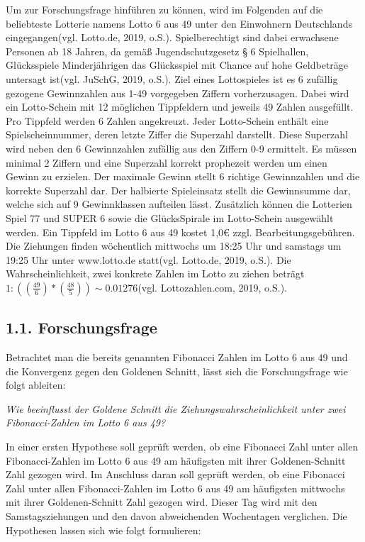 \documentclass[ngerman,]{article}
\newcommand{\euro}{€}
\begin{document}
Um zur Forschungsfrage hinführen zu können, wird im Folgenden auf die
beliebteste Lotterie namens Lotto 6 aus 49 unter den Einwohnern
Deutschlands eingegangen(vgl. Lotto.de, 2019, o.S.). Spielberechtigt
sind dabei erwachsene Personen ab 18 Jahren, da gemäß Jugendschutzgesetz
§ 6 Spielhallen, Glücksspiele Minderjährigen das Glücksspiel mit Chance
auf hohe Geldbeträge untersagt ist(vgl. JuSchG, 2019, o.S.). Ziel eines
Lottospieles ist es 6 zufällig gezogene Gewinnzahlen aus 1-49 vorgegeben
Ziffern vorherzusagen. Dabei wird ein Lotto-Schein mit 12 möglichen
Tippfeldern und jeweils 49 Zahlen ausgefüllt. Pro Tippfeld werden 6
Zahlen angekreuzt. Jeder Lotto-Schein enthält eine Spielscheinnummer,
deren letzte Ziffer die Superzahl darstellt. Diese Superzahl wird neben
den 6 Gewinnzahlen zufällig aus den Ziffern 0-9 ermittelt. Es müssen
minimal 2 Ziffern und eine Superzahl korrekt prophezeit werden um einen
Gewinn zu erzielen. Der maximale Gewinn stellt 6 richtige Gewinnzahlen
und die korrekte Superzahl dar. Der halbierte Spieleinsatz stellt die
Gewinnsumme dar, welche sich auf 9 Gewinnklassen aufteilen lässt.
Zusätzlich können die Lotterien Spiel 77 und SUPER 6 sowie die
GlücksSpirale im Lotto-Schein ausgewählt werden. Ein Tippfeld im Lotto 6
aus 49 kostet 1,0\euro{} zzgl. Bearbeitungsgebühren. Die Ziehungen
finden wöchentlich mittwochs um 18:25 Uhr und samstags um 19:25 Uhr
unter www.lotto.de statt(vgl. Lotto.de, 2019, o.S.). Die
Wahrscheinlichkeit, zwei konkrete Zahlen im Lotto zu ziehen beträgt
\(1:((\frac{49}{6})*(\frac{48}{5}))\sim0.01276\)(vgl. Lottozahlen.com,
2019, o.S.).

\subsection{1.1. Forschungsfrage}\label{forschungsfrage}

Betrachtet man die bereits genannten Fibonacci Zahlen im Lotto 6 aus 49
und die Konvergenz gegen den Goldenen Schnitt, lässt sich die
Forschungsfrage wie folgt ableiten:

\emph{Wie beeinflusst der Goldene Schnitt die Ziehungswahrscheinlichkeit
unter zwei Fibonacci-Zahlen im Lotto 6 aus 49?}

In einer ersten Hypothese soll geprüft werden, ob eine Fibonacci Zahl
unter allen Fibonacci-Zahlen im Lotto 6 aus 49 am häufigsten mit ihrer
Goldenen-Schnitt Zahl gezogen wird. Im Anschluss daran soll geprüft
werden, ob eine Fibonacci Zahl unter allen Fibonacci-Zahlen im Lotto 6
aus 49 am häufigsten mittwochs mit ihrer Goldenen-Schnitt Zahl gezogen
wird. Dieser Tag wird mit den Samstagsziehungen und den davon
abweichenden Wochentagen verglichen. Die Hypothesen lassen sich wie
folgt formulieren:
\end{document}
